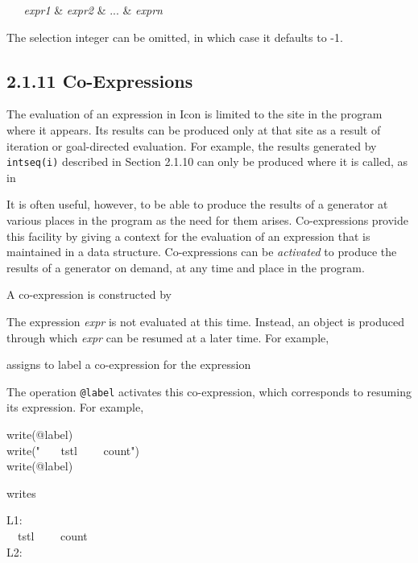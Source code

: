 \textit{\ \ \ expr1 }\& \textit{expr2 }\& ... \& \textit{exprn}

The selection integer can be omitted, in which case it defaults to -1.


\subsection[2.1.11 Co-Expressions]{2.1.11 Co-Expressions}

The evaluation of an expression in Icon is limited to the site in the
program where it appears. Its results can be produced only at that
site as a result of iteration or goal-directed evaluation. For
example, the results generated by \texttt{intseq(i)} described in
Section 2.1.10 can only be produced where it is called, as in


It is often useful, however, to be able to produce the results of a
generator at various places in the program as the need for them
arises. Co-expressions provide this facility by giving a context for
the evaluation of an expression that is maintained in a data
structure. Co-expressions can be \textit{activated }to produce the
results of a generator on demand, at any time and place in the
program.

A co-expression is constructed by


The expression \textit{expr} is not evaluated at this time. Instead,
an object is produced through which \textit{expr} can be resumed at a
later time. For example,


\noindent assigns to label a co-expression for the expression


\noindent
The operation \texttt{@label} activates this co-expression, which
corresponds to resuming its expression. For example,

\begin{iconcode}
\>write(@label)\\
\>write(" \ \ \ tstl \ \ \ \ count")\\
\>write(@label)
\end{iconcode}

\noindent writes

\begin{iconcode}
\>L1:\\
\>\>\ \ tstl \ \ \ \ count\\
\>L2:
\end{iconcode}

